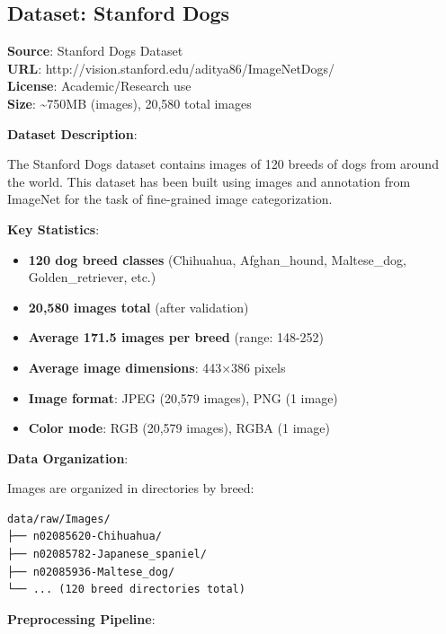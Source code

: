 \documentclass[
  letterpaper,
  DIV=11,
  numbers=noendperiod]{scrartcl}
\providecommand{\tightlist}{%
  \setlength{\itemsep}{0pt}\setlength{\parskip}{0pt}}
\begin{document}
\subsection{Dataset: Stanford Dogs}\label{dataset-stanford-dogs}

\textbf{Source}: Stanford Dogs Dataset\\
\textbf{URL}: http://vision.stanford.edu/aditya86/ImageNetDogs/\\
\textbf{License}: Academic/Research use\\
\textbf{Size}: \textasciitilde750MB (images), 20,580 total images

\textbf{Dataset Description}:

The Stanford Dogs dataset contains images of 120 breeds of dogs from
around the world. This dataset has been built using images and
annotation from ImageNet for the task of fine-grained image
categorization.

\textbf{Key Statistics}:

\begin{itemize}
\tightlist
\item
  \textbf{120 dog breed classes} (Chihuahua, Afghan\_hound,
  Maltese\_dog, Golden\_retriever, etc.)
\item
  \textbf{20,580 images total} (after validation)
\item
  \textbf{Average 171.5 images per breed} (range: 148-252)
\item
  \textbf{Average image dimensions}: 443×386 pixels
\item
  \textbf{Image format}: JPEG (20,579 images), PNG (1 image)
\item
  \textbf{Color mode}: RGB (20,579 images), RGBA (1 image)
\end{itemize}

\textbf{Data Organization}:

Images are organized in directories by breed:

\begin{verbatim}
data/raw/Images/
├── n02085620-Chihuahua/
├── n02085782-Japanese_spaniel/
├── n02085936-Maltese_dog/
└── ... (120 breed directories total)
\end{verbatim}

\textbf{Preprocessing Pipeline}:
\end{document}
